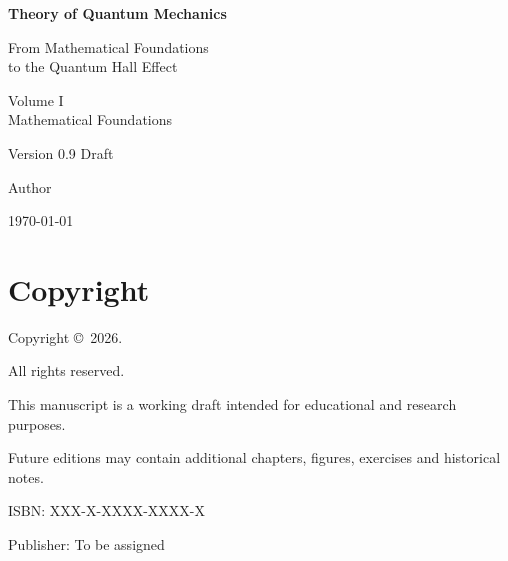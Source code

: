 \begin{titlepage}
	
	\centering
	
	\vspace*{2cm}
	
	{\Huge\bfseries Theory of Quantum Mechanics\par}
	
	\vspace{0.8cm}
	
	{\Large From Mathematical Foundations\\[0.2cm]
		to the Quantum Hall Effect\par}
	
	\vspace{1cm}
	
	{\Large Volume I\\
		Mathematical Foundations\par}
	
	\vspace{2cm}
	
	Version 0.9 Draft
	
	\vfill
	
	Author
	
	\vspace{0.5cm}
	
	\today
	
\end{titlepage}


\cleardoublepage

\thispagestyle{empty}

\section*{Copyright}

Copyright \copyright\ 2026.

All rights reserved.

This manuscript is a working draft intended for educational and research
purposes.

Future editions may contain additional chapters, figures, exercises and
historical notes.

\vfill

ISBN: XXX-X-XXXX-XXXX-X

Publisher: To be assigned


